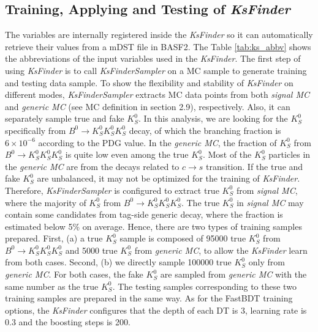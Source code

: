 \begin{comment}
\begin{minipage}[ht]{0.5\linewidth}
\centering 
\texttt{[image: rank1]}
\end{minipage}
\end{comment}
	


\subsection{Training, Applying and Testing of \textit{KsFinder}}
The variables are internally registered inside the \textit{KsFinder} so it can automatically retrieve their values from a mDST file in BASF2. The Table \ref{tab:ks_abbv} shows the abbreviations of the input variables used in the \textit{KsFinder}. The first step of using \textit{KsFinder} is to call \textit{KsFinderSampler} on a MC sample to generate training and testing data sample. To show the flexibility and stability of \textit{KsFinder} on different modes, \textit{KsFinderSampler} extracts MC data points from both \textit{signal MC} and \textit{generic MC} (see MC definition in section 2.9), respectively. Also, it can separately sample true and fake $K_S^0$. In this analysis, we are looking for the $K_S^0$ specifically from  $B^0 \to K_S^0  K_S^0  K_S^0$ decay, of which the branching fraction is $6\times 10^{-6}$ according to the PDG value. In the \textit{generic MC}, the fraction of $K_S^0$ from $B^0 \to K_S^0  K_S^0  K_S^0$ is quite low even among the true $K_S^0$. Most of the $K_S^0$ particles in the \textit{generic MC} are from the decays related to $ c \to s$ transition. If the true and fake $K_S^0$ are unbalanced, it may not be optimized for the training of \textit{KsFinder}. Therefore, \textit{KsFinderSampler} is configured to extract true $K_S^0$ from \textit{signal MC}, where the majority of $K_S^0$ from $B^0 \to K_S^0  K_S^0  K_S^0$. The true $K_S^0$ in \textit{signal MC} may contain some candidates from tag-side generic decay, where the fraction is estimated below 5\% on average. Hence, there are two types of training samples prepared. First, (a) a true $K_S^0$ sample is composed of 95000 true $K_S^0$ from $B^0 \to K_S^0  K_S^0  K_S^0$ and 5000  true $K_S^0$ from \textit{generic MC}, to allow the \textit{KsFinder} learn from both cases. Second, (b) we directly sample 100000 true $K_S^0$ only from \textit{generic MC}. For both cases, the fake $K_S^0$ are sampled from \textit{generic MC} with the same number as the true $K_S^0$. The testing samples corresponding to these two training samples are prepared in the same way. As for the FastBDT training options, the \textit{KsFinder} configures that the depth of each DT is 3, learning rate is 0.3 and the boosting steps is 200. 

